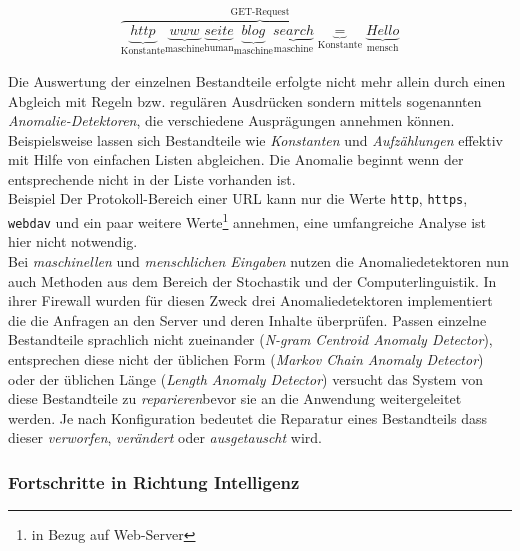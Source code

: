 \begin{align}
  \overbrace{
    \underbrace{http}_\text{Konstante} \underbrace{www}_\text{maschine}\underbrace{seite}_\text{human}\underbrace{blog}_\text{maschine}\underbrace{search}_\text{maschine}\underbrace{=}_\text{Konstante}\underbrace{Hello}_\text{mensch}
  }^\text{GET-Request}
\end{align}

Die Auswertung der einzelnen Bestandteile erfolgte nicht mehr allein durch einen Abgleich mit Regeln bzw. regulären Ausdrücken sondern mittels sogenannten \emph{Anomalie-Detektoren}, die verschiedene Ausprägungen annehmen können. Beispielsweise lassen sich Bestandteile wie \emph{Konstanten} und \emph{Aufzählungen} effektiv mit Hilfe von einfachen Listen abgleichen. Die Anomalie beginnt wenn der entsprechende nicht in der Liste vorhanden ist.\\

\textcolor{bhtGray}{ Beispiel} Der Protokoll-Bereich einer URL kann nur die Werte \verb=http=, \verb=https=, \verb=webdav= und ein paar weitere Werte\footnote{in Bezug auf Web-Server} annehmen, eine umfangreiche Analyse ist hier nicht notwendig. \\

Bei \emph{maschinellen} und \emph{menschlichen Eingaben} nutzen die Anomaliedetektoren nun auch Methoden aus dem Bereich der Stochastik und der Computerlinguistik. In ihrer Firewall wurden für diesen Zweck drei Anomaliedetektoren implementiert die die Anfragen an den Server und deren Inhalte überprüfen. Passen einzelne Bestandteile sprachlich nicht zueinander (\emph{N-gram Centroid Anomaly Detector}), entsprechen diese nicht der üblichen Form (\emph{Markov Chain Anomaly Detector}) oder der üblichen Länge (\emph{Length Anomaly Detector}) versucht das System von~\cite{Krueger2010} diese Bestandteile zu \glqq\emph{reparieren}\grqq bevor sie an die Anwendung weitergeleitet werden. Je nach Konfiguration bedeutet die Reparatur eines Bestandteils dass dieser \emph{verworfen}, \emph{verändert} oder \emph{ausgetauscht} wird. 






\subsubsection{Fortschritte in Richtung Intelligenz}

